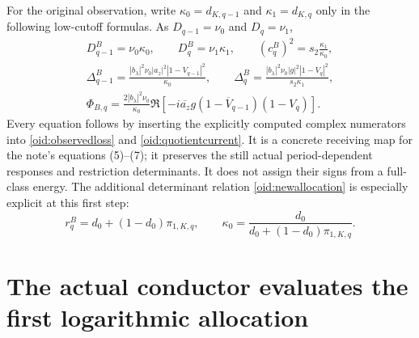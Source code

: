 \documentclass[11pt,a4paper]{article}
\begin{document}
For the original observation, write
$\kappa_0=d_{K,q-1}$ and $\kappa_1=d_{K,q}$ only in the following
low-cutoff formulas. As $D_{q-1}=\nu_0$ and $D_q=\nu_1$,
\begin{equation}\label{oid:lowobservation}
\begin{gathered}
 D_{q-1}^B=\nu_0\kappa_0,\qquad
 D_q^B=\nu_1\kappa_1,\qquad
 (c_q^B)^2=s_2\frac{\kappa_1}{\kappa_0},\\
 \Delta_{q-1}^B=
 \frac{|b_\lambda|^2\nu_0|a_z|^2|1-V_{q-1}|^2}{\kappa_0},
 \qquad
 \Delta_q^B=
 \frac{|b_\lambda|^2\nu_0|g|^2|1-V_q|^2}{s_2\kappa_1},\\
 \boxed{\Phi_{B,q}=
 \frac{2|b_\lambda|^2\nu_0}{\kappa_0}
 \Re\left[-i\overline{a_z}g
 (1-\overline V_{q-1})(1-V_q)\right].}
\end{gathered}
\end{equation}
Every equation follows by inserting the explicitly computed complex
numerators into \eqref{oid:observedloss} and
\eqref{oid:quotientcurrent}. It is a concrete receiving map for the
note's equations (5)--(7); it preserves the still actual
period-dependent responses and restriction determinants.
It does not assign their signs from a full-class energy.
The additional determinant relation \eqref{oid:newallocation} is
especially explicit at this first step:
\begin{equation}\label{oid:lowallocation}
 \boxed{r_q^B=d_0+(1-d_0)\pi_{1,K,q},\qquad
 \kappa_0=\frac{d_0}{d_0+(1-d_0)\pi_{1,K,q}}.}
\end{equation}

\section{The actual conductor evaluates the first logarithmic allocation}
\end{document}
